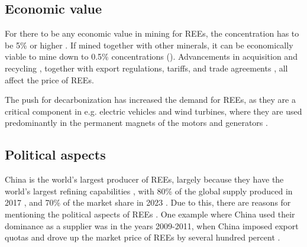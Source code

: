 \subsection{Economic value}

For there to be any economic value in mining for REEs, the concentration has to be 5\% or higher \cite{britannica2024}. If mined together with other minerals, it can be economically viable to mine down to 0.5\% concentrations (\cite{britannica2024}). Advancements in acquisition and recycling \cite{REELandscape}, together with export regulations, tariffs, and trade agreements \cite{politics2022}, all affect the price of REEs.

The push for decarbonization has increased the demand for REEs, as they are a critical component in e.g. electric vehicles and wind turbines, where they are used predominantly in the permanent magnets of the motors and generators \cite{windturbines2022}.

\subsection{Political aspects}

China is the world's largest producer of REEs, largely because they have the world's largest refining capabilities \cite{ChinaRefining}, with 80\% of the global supply produced in 2017 \cite{britannica2024}, and 70\% of the market share in 2023 \cite{ChinaRefining}. Due to this, there are reasons for mentioning the political aspects of REEs \cite{britannica2024}. One example where China used their dominance as a supplier was in the years 2009-2011, when China imposed export quotas and drove up the market price of REEs by several hundred percent \cite{britannica2024}.